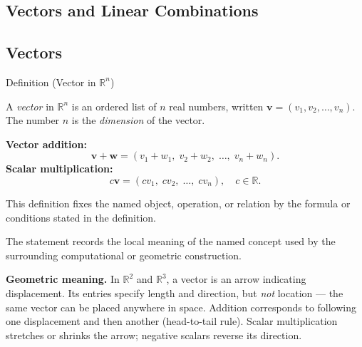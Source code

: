 
\subsection{Vectors and Linear Combinations}

\subsection*{Vectors}

\begin{definitionbox}{Definition (Vector in $\mathbb{R}^n$)}
\begin{definition}
\label{def:vector-rn}
A \emph{vector} in $\mathbb{R}^n$ is an ordered list of $n$ real numbers,
written $\mathbf{v} = (v_1, v_2, \ldots, v_n)$.
The number $n$ is the \emph{dimension} of the vector.

\medskip
\textbf{Vector addition:}
\[
  \mathbf{v} + \mathbf{w} = (v_1 + w_1,\; v_2 + w_2,\; \ldots,\; v_n + w_n).
\]
\textbf{Scalar multiplication:}
\[
  c\mathbf{v} = (cv_1,\; cv_2,\; \ldots,\; cv_n), \quad c \in \mathbb{R}.
\]
\end{definition}
\end{definitionbox}
\begin{remark*}
This definition fixes the named object, operation, or relation by the formula
or conditions stated in the definition.
\end{remark*}

\begin{remark*}[Interpretation]
The statement records the local meaning of the named concept used by the
surrounding computational or geometric construction.
\end{remark*}

\DefinitionalRoot

\begin{remark*}[Exposition]
\textbf{Geometric meaning.}
In $\mathbb{R}^2$ and $\mathbb{R}^3$, a vector is an arrow indicating displacement.
Its entries specify length and direction, but \emph{not} location ---
the same vector can be placed anywhere in space.
Addition corresponds to following one displacement and then another (head-to-tail rule).
Scalar multiplication stretches or shrinks the arrow; negative scalars reverse its direction.
\end{remark*}

